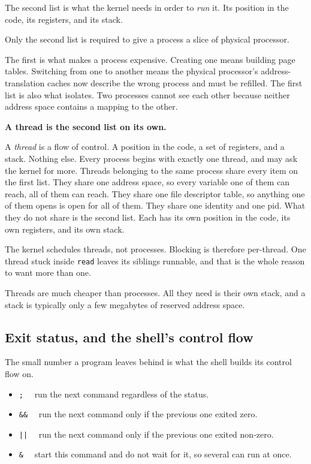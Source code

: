 \documentclass[11pt,a4paper]{article}
\begin{document}
The second list is what the kernel needs in order to \emph{run} it. Its position in the code, its
registers, and its stack.

Only the second list is required to give a process a slice of physical processor.

The first is what makes a
process expensive. Creating one means building page tables. Switching from one to another means the
physical processor's address-translation caches now describe the wrong process and must be refilled. The
first list is also what isolates. Two processes cannot see each other because neither address space
contains a mapping to the other.

\textbf{A thread is the second list on its own.}

A \emph{thread} is a flow of control. A position in the code, a set of registers, and a stack.
Nothing else. Every process begins with exactly one thread, and may ask the kernel for more.
Threads belonging to the same process share every item on the first list. They share one address
space, so every variable one of them can reach, all of them can reach. They share one file
descriptor table, so anything one of them opens is open for all of them. They share one identity
and one pid. What they do not share is the second list. Each has its own position in the code, its
own registers, and its own stack.

The kernel schedules threads, not processes. Blocking is therefore per-thread. One thread stuck
inside \texttt{read} leaves its siblings runnable, and that is the whole reason to want more than
one.

Threads are much cheaper than processes. All they need is their own stack, and a stack is
typically only a few megabytes of reserved address space.


\subsection{Exit status, and the shell's control flow}

The small number a program leaves behind is what the shell builds its control flow on.

\begin{itemize}
\item \texttt{;} \ \ run the next command regardless of the status.
\item \texttt{\&\&} \ \ run the next command only if the previous one exited zero.
\item \texttt{||} \ \ run the next command only if the previous one exited non-zero.
\item \texttt{\&} \ \ start this command and do not wait for it, so several can run at once.
\end{itemize}
\end{document}
